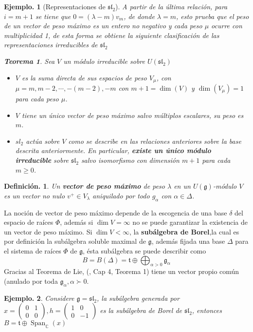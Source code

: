 \documentclass[11pt,a4paper]{article}
\newtheorem{definition}{Definici\'on.}
\newtheorem{theorem}{Teorema}
\newtheorem{example}{Ejemplo.}
\newcommand{\Span}{\operatorname{Span}}
\newcommand{\mfg}{\mathfrak{g}}
\begin{document}
\begin{example}[Representaciones de $\mathfrak{sl}_2$]
A partir de la última relación, para $i=m+1$ se tiene que  $0= (\lambda-m) v_m$, de donde $\lambda=m$, esto prueba que el peso de un vector de peso máximo es un entero no negativo y  cada peso $\mu$ ocurre con multiplicidad 1, de esta forma se obtiene la siguiente clasificación de las representaciones irreducibles de $\mathfrak{sl}_2$
\begin{theorem} Sea $V$ un módulo irreducible sobre $U(\mathfrak{sl}_2)$
\begin{itemize}
    \item $V$ es la suma directa de sus espacios de peso $V_{\mu}$, con $\mu=m,m-2, \cdots, -(m-2), -m$ con $m+1=\dim(V)$ y $\dim (V_{\mu})=1$ para cada peso $\mu$.
    \item $V$ tiene un único vector de peso máximo salvo múltiplos escalares, su peso es $m$.
    \item $sl_2$ actúa sobre $V$ como se describe en las relaciones anteriores sobre la base descrita anteriormente. En particular, \textbf{existe un único módulo irreducible} sobre $\mathfrak{sl}_2$ salvo isomorfismo con dimensión $m+1$ para cada $m\geq 0$. 
\end{itemize}

\end{theorem}
\end{example}
\begin{definition}
Un \textbf{vector de peso máximo}  de peso $\lambda$ en un $U(\mfg)$-módulo $V$ es un vector no nulo $v^+ \in V_{\lambda}$ aniquilado por todo $g_{\alpha}$ con $\alpha \in \Delta$.
\end{definition}
La noción de vector de peso máximo depende de la escogencia de una base $\delta$ del espacio de raíces $\Phi$, además  si $\dim V= \infty $ no se puede garantizar la existencia de un vector de peso máximo. Si $\dim V< \infty$, la \textbf{subálgebra de Borel},la cual es por definición la subálgebra soluble maximal de $\mfg$, además fijada una base $\Delta$ para el sistema de raíces $\Phi$ de $\mfg$, ésta subálgebra se puede describir como 
$$ B=B(\Delta)= \mathfrak{t} \oplus \bigoplus_{\alpha>0}\mfg_{\alpha} $$
Gracias al Teorema de Lie, (\cite{humphreys2012introduction}, Cap 4, Teorema 1) tiene un vector propio común (anulado por toda $\mfg_{\alpha}, \alpha \succ 0$. \\
\begin{example}
Considere $\mfg=\mathfrak{sl}_2$, la subálgebra generada por $x= \begin{pmatrix} 0 & 1 \\
0 & 0\end{pmatrix},h= \begin{pmatrix} 1 & 0 \\
0 & -1\end{pmatrix}$ es la subálgebra de Borel de $\mathfrak{sl}_2$, entonces
$B= \mathfrak{t} \oplus \Span_{\mathbb{C}}(x)$
\end{example}
\end{document}
